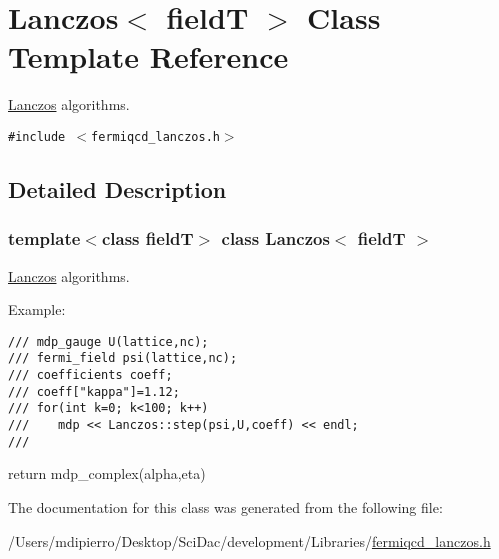 \hypertarget{class_lanczos}{
\section{Lanczos$<$ fieldT $>$ Class Template Reference}
\label{class_lanczos}
}
\hyperlink{class_lanczos}{Lanczos} algorithms.  


{\tt \#include $<$fermiqcd\_\-lanczos.h$>$}



\subsection{Detailed Description}
\subsubsection*{template$<$class fieldT$>$ class Lanczos$<$ fieldT $>$}

\hyperlink{class_lanczos}{Lanczos} algorithms. 

Example: 

\footnotesize\begin{verbatim}
/// mdp_gauge U(lattice,nc);
/// fermi_field psi(lattice,nc);
/// coefficients coeff;
/// coeff["kappa"]=1.12;
/// for(int k=0; k<100; k++)
///    mdp << Lanczos::step(psi,U,coeff) << endl;
/// \end{verbatim}
\normalsize
 return mdp\_\-complex(alpha,eta) 

The documentation for this class was generated from the following file:\begin{CompactItemize}
\item 
/Users/mdipierro/Desktop/SciDac/development/Libraries/\hyperlink{fermiqcd__lanczos_8h}{fermiqcd\_\-lanczos.h}\end{CompactItemize}
